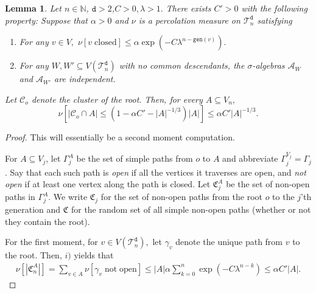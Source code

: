 \documentclass[article,11pt,reqno]{amsart}
\newtheorem{lemma}[theorem]{Lemma}
\begin{document}
\begin{appendix}
\begin{lemma} \label{lemma:Big_Bad_Tree_lemma} Let $n\in \mathbb{N}$, $\mathtt{d}> 2$,$C>0, \lambda >1.$ There exists $C'>0$ with the following property: Suppose that $\alpha>0$ and $\nu$ is a percolation measure  on $\mathscr{T}_n^\mathtt{d}$ satisfying \begin{enumerate}
    \item[$i)$] For any $v\in V,$ 
    $
    \nu[v\;\mathrm{ closed}]\leq \alpha \exp\left(-C \lambda^{
    n-\mathtt{gen}(v)}\right).
    $
    \item[$ii)$] For any $W,W'\subseteq V(\mathscr{T}_n^\mathtt{d})$ with no common descendants, the $\sigma$-algebras $\mathcal{A}_{W}$ and $\mathcal{A}_{W'}$ are independent.
\end{enumerate}
Let $\mathcal{C}_o$ denote the cluster of the root.  Then, for every $A\subseteq V_n,$ 
$$
\nu[|\mathcal{C}_o \cap A|\leq (1-\alpha C'-|A|^{-1/3}) |A| ]\leq \alpha C'|A|^{-1/3}.
$$
\end{lemma}
\begin{proof}
This will essentially be a second moment computation. 



For $A\subseteq V_j$, let $\Gamma^A_j$ be the set of simple paths from $o$ to $A$ and abbreviate $\Gamma^{V_j}_j = \Gamma_j$.  Say that each such path is \emph{open} if all the vertices it traverses are open, and \emph{not open} if at least one vertex along the path is closed. Let $\mathfrak{C}^{A}_j$ be the set of non-open paths in $\Gamma^{A}_j$. We write $\mathfrak{C}_j$ for the set of non-open paths from the root $o$ to the $j$'th generation 
and $\mathfrak{C}$ for the random set of all simple non-open paths (whether or not they contain the root). 

For the first moment, for $v\in V(\mathscr{T}_n^{\mathtt{d}}),$ let $\gamma_v$ denote the unique path from $v$ to the root. Then, $i)$ yields that
\begin{align}\label{eq:expected_connection}
\nu[|\mathfrak{C}_n^A|]=\sum_{v\in A} \nu[\gamma_v\mathrm{\; not\; open}]\leq  |A|\alpha \sum_{k=0}^n\exp\left(-C \lambda^{
    n-k}\right)\leq \alpha C' |A|. 
\end{align}



\end{proof}
\end{appendix}
\end{document}
